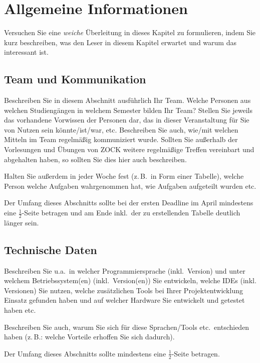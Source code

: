 \documentclass[12pt,a4paper,bibliography=totocnumbered,listof=totocnumbered]{article}
\begin{document}
\newpage
\section{Allgemeine Informationen}
Versuchen Sie eine \emph{weiche} Überleitung in dieses Kapitel zu formulieren, indem Sie kurz beschreiben, was den Leser in diesem Kapitel erwartet und warum das interessant ist.
\subsection{Team und Kommunikation}
Beschreiben Sie in diesem Abschnitt ausführlich Ihr Team. Welche Personen aus welchen Studiengängen in welchem Semester bilden Ihr Team? Stellen Sie jeweils das vorhandene Vorwissen der Personen dar, das in dieser Veranstaltung für Sie von Nutzen sein könnte/ist/war, etc. Beschreiben Sie auch, wie/mit welchen Mitteln im Team regelmäßig kommuniziert wurde. Sollten Sie außerhalb der Vorlesungen und Übungen von ZOCK weitere regelmäßige Treffen vereinbart und abgehalten haben, so sollten Sie dies hier auch beschreiben.

Halten Sie außerdem in jeder Woche fest (z.\,B.\ in Form einer Tabelle), welche Person welche Aufgaben wahrgenommen hat, wie Aufgaben aufgeteilt wurden etc.

Der Umfang dieses Abschnitts sollte bei der ersten Deadline im April mindestens eine $\frac{1}{2}$-Seite betragen und am Ende inkl.\ der zu erstellenden Tabelle deutlich länger sein.

\subsection{Technische Daten}
Beschreiben Sie u.a.\ in welcher Programmiersprache (inkl.\ Version) und unter welchem Betriebssystem(en) (inkl.\ Version(en)) Sie entwickeln, welche IDEs (inkl. Versionen) Sie nutzen, welche zusätzlichen Tools bei Ihrer Projektentwicklung Einsatz gefunden haben und auf welcher Hardware Sie entwickelt und getestet haben etc.

Beschreiben Sie auch, warum Sie sich für diese Sprachen/Tools etc.\ entschieden haben (z.\,B.: welche Vorteile erhoffen Sie sich dadurch).

Der Umfang dieses Abschnitts sollte mindestens eine $\frac{1}{2}$-Seite betragen.
\end{document}
